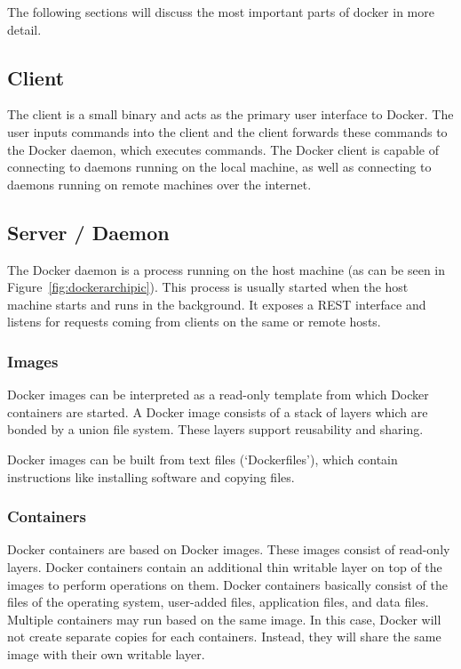 The following sections will discuss the most important parts of docker in more detail.

\subsection{Client}
The client is a small binary and acts as the primary user interface to Docker. The user inputs commands into the client and the client forwards these commands to the Docker daemon, which executes commands.
The Docker client is capable of connecting to daemons running on the local machine, as well as connecting to daemons running on remote machines over the internet.

\subsection{Server / Daemon}
The Docker daemon is a process running on the host machine (as can be seen in Figure~\ref{fig:dockerarchipic}). This process is usually started when the host machine starts and runs in the background. It exposes a REST interface and listens for requests coming from clients on the same or remote hosts.

\subsubsection{Images}
Docker images can be interpreted as a read-only template from which Docker containers are
started. A Docker image consists of a stack of layers which are bonded by a union file system. These layers support reusability and sharing.

Docker images can be built from text files (`Dockerfiles'), which contain instructions like installing software and copying files.

\subsubsection{Containers}
Docker containers are based on Docker images. These images consist of read-only
layers. Docker containers contain an additional thin writable layer on top of the images to
perform operations on them. Docker containers basically consist of the files of the operating system,
user-added files, application files, and data files. Multiple containers may run
based on the same image. In this case, Docker will not create separate copies for
each containers. Instead, they will share the same image with their own writable layer.

